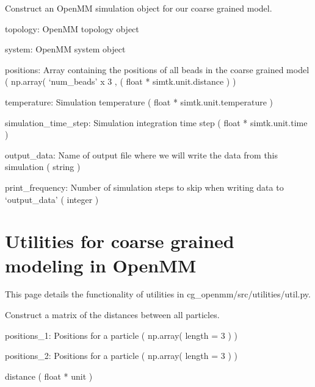 \documentclass[letterpaper,12pt,english,openany,oneside]{sphinxmanual}
\begin{document}
\begin{fulllineitems}
\label{\detokenize{simulation:simulation.tools.minimize_structure}}
Construct an OpenMM simulation object for our coarse grained model.

topology: OpenMM topology object

system: OpenMM system object

positions: Array containing the positions of all beads
in the coarse grained model
( np.array( ‘num\_beads’ x 3 , ( float * simtk.unit.distance ) )

temperature: Simulation temperature ( float * simtk.unit.temperature )

simulation\_time\_step: Simulation integration time step
( float * simtk.unit.time )

output\_data: Name of output file where we will write the data from this
simulation ( string )

print\_frequency: Number of simulation steps to skip when writing data
to ‘output\_data’ ( integer )

\end{fulllineitems}



\chapter{Utilities for coarse grained modeling in OpenMM}
\label{\detokenize{utilities:utilities-for-coarse-grained-modeling-in-openmm}}\label{\detokenize{utilities::doc}}
This page details the functionality of utilities in cg\_openmm/src/utilities/util.py.

\label{\detokenize{utilities:module-utilities.util}}

\begin{fulllineitems}
\label{\detokenize{utilities:utilities.util.distance}}
Construct a matrix of the distances between all particles.

positions\_1: Positions for a particle
( np.array( length = 3 ) )

positions\_2: Positions for a particle
( np.array( length = 3 ) )

distance
( float * unit )

\end{fulllineitems}
\end{document}
